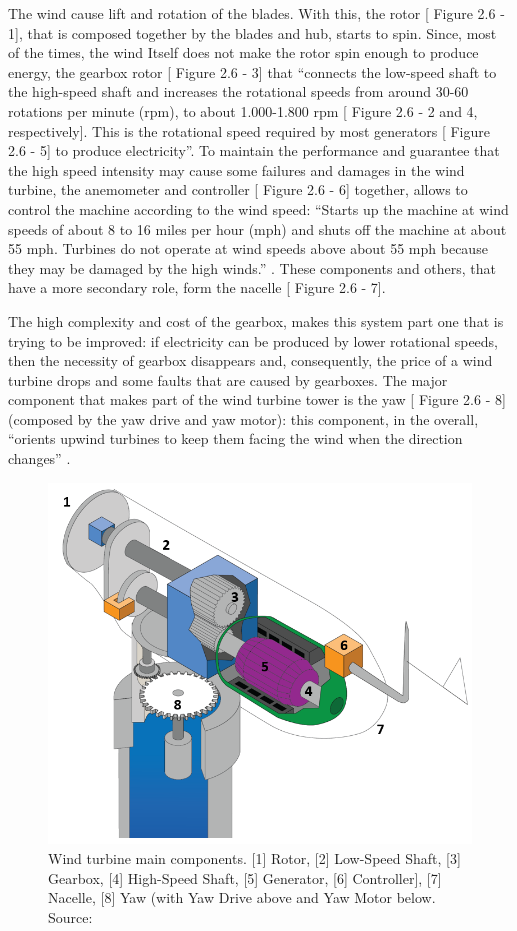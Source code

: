 The wind cause lift and rotation of the blades. With this, the rotor [ Figure 2.6 - 1], that is composed together by the blades and hub, starts to spin. Since, most of the times, the wind Itself does not make the rotor spin enough to produce energy, the gearbox rotor [ Figure 2.6 - 3] that “connects the low-speed shaft to the high-speed shaft and increases the rotational speeds from around 30-60 rotations per minute (rpm), to about 1.000-1.800 rpm [ Figure 2.6 - 2 and 4, respectively]. This is the rotational speed required by most generators [ Figure 2.6 - 5] to produce electricity”. To maintain the performance and guarantee that the high speed intensity may cause some failures and damages in the wind turbine, the anemometer and controller [ Figure 2.6 - 6] together, allows to control the machine according to the wind speed: “Starts up the machine at wind speeds of about 8 to 16 miles per hour (mph) and shuts off the machine at about 55 mph. Turbines do not operate at wind speeds above about 55 mph because they may be damaged by the high winds.” \cite{OLD_29_WIND}. These components and others, that have a more secondary role, form the nacelle [ Figure 2.6 - 7].

The high complexity and cost of the gearbox, makes this system part one that is trying to be improved: if electricity can be produced by lower rotational speeds, then the necessity of gearbox disappears and, consequently, the price of a wind turbine drops and some faults that are caused by gearboxes.
The major component that makes part of the wind turbine tower is the yaw [ Figure 2.6 - 8] (composed by the yaw drive and yaw motor): this component, in the overall, “orients upwind turbines to keep them facing the wind when the direction changes” \cite{OLD_29_WIND}.


\begin{figure}[htbp]
	\centering
	\includegraphics[scale=0.5]{Chapters/Figures/background_fig8.PNG}
	\caption{Wind turbine main components. [1] Rotor, [2] Low-Speed Shaft, [3] Gearbox, [4] High-Speed Shaft, [5] Generator, [6] Controller], [7] Nacelle, [8] Yaw (with Yaw Drive above and Yaw Motor below. Source: \cite{OLD_29_WIND} }
	\label{fig:Figuras_Tree_silhouettes-vectorial}
\end{figure}


